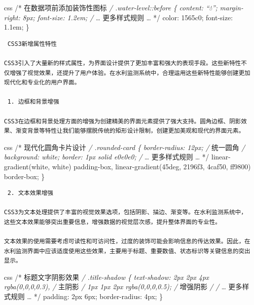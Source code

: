 css /* 在数据项前添加装饰性图标 \emph{/ .water-level::before \{ content: ``💧''; margin-right: 8px; font-size: 1.2em; /} \ldots{} 更多样式规则 \ldots{} */ color: 1565c0; font-size: 1.1em; \}

\begin{lstlisting}
 CSS3新增属性特性

CSS3引入了大量新的样式属性，为界面设计提供了更加丰富和强大的表现手段。这些新特性不仅增强了视觉效果，还提升了用户体验。在水利监测系统中，合理运用这些新特性能够创建更加现代化和专业化的用户界面。

 1. 边框和背景增强

CSS3在边框和背景处理方面的增强为创建精美的界面元素提供了强大支持。圆角边框、阴影效果、渐变背景等特性让我们能够摆脱传统的矩形设计限制，创建更加美观和现代的界面元素。
\end{lstlisting}

css /* 现代化圆角卡片设计 \emph{/ .rounded-card \{ border-radius: 12px; /} 统一圆角 \emph{/ background: white; border: 1px solid e0e0e0; /} \ldots{} 更多样式规则 \ldots{} */ linear-gradient(white, white) padding-box, linear-gradient(45deg, 2196f3, 4caf50, ff9800) border-box; \}

\begin{lstlisting}
 2. 文本效果增强

CSS3为文本处理提供了丰富的视觉效果选项，包括阴影、描边、渐变等。在水利监测系统中，这些文本效果能够突出重要信息，增强数据的视觉层次感，提升整体界面的专业性。

文本效果的使用需要考虑可读性和可访问性，过度的装饰可能会影响信息的传达效果。因此，在水利监测界面中应该适度使用这些效果，主要用于标题、重要数值、状态标识等关键信息的突出显示。
\end{lstlisting}

css /* 标题文字阴影效果 \emph{/ .title-shadow \{ text-shadow: 2px 2px 4px rgba(0,0,0,0.3), /} 主阴影 \emph{/ 1px 1px 2px rgba(0,0,0,0.5); /} 增强阴影 \emph{/ /} \ldots{} 更多样式规则 \ldots{} */ padding: 2px 6px; border-radius: 4px; \}

